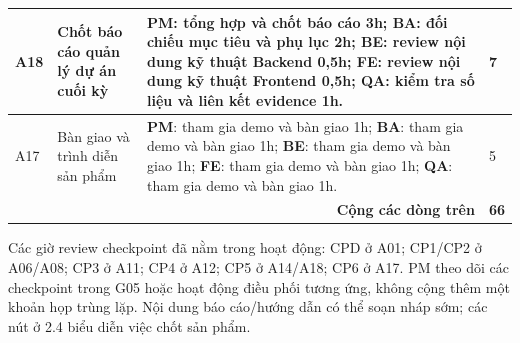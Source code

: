 \documentclass{article}
\begin{document}
\begin{landscape}
\begin{table}[H]
\begin{tabularx}{\linewidth}{|p{1.1cm}|p{5.3cm}|>{\raggedright\arraybackslash}X|p{1.25cm}|}
A18 & Chốt báo cáo quản lý dự án cuối kỳ & \textbf{PM}: tổng hợp và chốt báo cáo 3h; \textbf{BA}: đối chiếu mục tiêu và phụ lục 2h; \textbf{BE}: review nội dung kỹ thuật Backend 0,5h; \textbf{FE}: review nội dung kỹ thuật Frontend 0,5h; \textbf{QA}: kiểm tra số liệu và liên kết evidence 1h. & 7 \\ \hline
A17 & Bàn giao và trình diễn sản phẩm & \textbf{PM}: tham gia demo và bàn giao 1h; \textbf{BA}: tham gia demo và bàn giao 1h; \textbf{BE}: tham gia demo và bàn giao 1h; \textbf{FE}: tham gia demo và bàn giao 1h; \textbf{QA}: tham gia demo và bàn giao 1h. & 5 \\ \hline
\multicolumn{3}{|r|}{\textbf{Cộng các dòng trên}} & \textbf{66} \\ \hline
\end{tabularx}
\end{table}

\noindent Các giờ review checkpoint đã nằm trong hoạt động: CPD ở A01; CP1/CP2 ở A06/A08; CP3 ở A11; CP4 ở A12; CP5 ở A14/A18; CP6 ở A17. PM theo dõi các checkpoint trong G05 hoặc hoạt động điều phối tương ứng, không cộng thêm một khoản họp trùng lặp. Nội dung báo cáo/hướng dẫn có thể soạn nháp sớm; các nút ở 2.4 biểu diễn việc chốt sản phẩm.
\newpage

\end{landscape}
\end{document}
